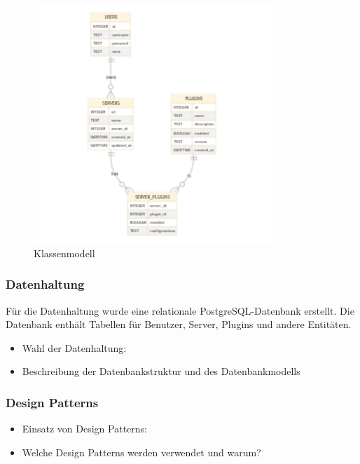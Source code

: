 \begin{figure}[!h]
  \centering
  \includegraphics[width=0.8\textwidth]{images/database-diagram-2024-05-27.png}
  \caption{Klassenmodell}\label{fig:klassenmodell}
\end{figure}

\subsubsection{Datenhaltung}\label{datenhaltung}

Für die Datenhaltung wurde eine relationale PostgreSQL-Datenbank erstellt. Die Datenbank enthält Tabellen für Benutzer, Server, Plugins und andere Entitäten.

\begin{itemize}
  \item
        Wahl der Datenhaltung:
  \item
        Beschreibung der Datenbankstruktur und des Datenbankmodells
\end{itemize}

\subsubsection{Design Patterns}\label{design-patterns}

\begin{itemize}
  \item
        Einsatz von Design Patterns:
  \item
        Welche Design Patterns werden verwendet und warum?
\end{itemize}

